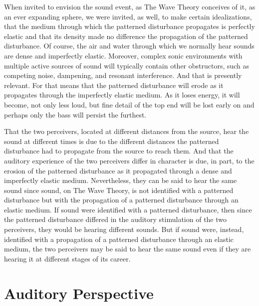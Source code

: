 When invited to envision the sound event, as The Wave Theory conceives of it, as an ever expanding sphere, we were invited, as well, to make certain idealizations, that the medium through which the patterned disturbance propagates is perfectly elastic and that its density made no difference the propagation of the patterned disturbance. Of course, the air and water through which we normally hear sounds are dense and imperfectly elastic. Moreover, complex sonic environments with multiple active sources of sound will typically contain other obstructors, such as competing noise, dampening, and resonant interference. And that is presently relevant. For that means that the patterned disturbance will erode as it propagates through the imperfectly elastic medium. As it loses energy, it will become, not only less loud, but fine detail of the top end will be lost early on and perhaps only the bass will persist the furthest. 

That the two perceivers, located at different distances from the source, hear the sound at different times is due to the different distances the patterned disturbance had to propagate from the source to reach them. And that the auditory experience of the two perceivers differ in character is due, in part, to the erosion of the patterned disturbance as it propagated through a dense and imperfectly elastic medium. Nevertheless, they can be said to hear the same sound since sound, on The Wave Theory, is not identified with a patterned disturbance but with the propagation of a patterned disturbance through an elastic medium. If sound were identified with a patterned disturbance, then since the patterned disturbance differed in the auditory stimulation of the two perceivers, they would be hearing different sounds. But if sound were, instead, identified with a propagation of a patterned disturbance through an elastic medium, the two perceivers may be said to hear the same sound even if they are hearing it at different stages of its career.


\section{Auditory Perspective} %
\label{sec:auditory_perspective}

